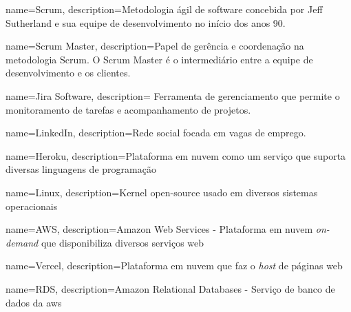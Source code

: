 



 {
	name=Scrum,
	description={Metodologia ágil de software concebida por Jeff Sutherland e sua equipe de desenvolvimento no início dos anos 90.}
}


 {
	name=Scrum Master,
	description={Papel de gerência e coordenação na metodologia Scrum. O Scrum Master é o intermediário entre a equipe de desenvolvimento e os clientes.}
}

 {
	name=Jira Software,
	description={ Ferramenta de gerenciamento que permite o monitoramento de tarefas e acompanhamento de projetos.}
}   

 {
	name=LinkedIn,
	description={Rede social focada em vagas de emprego.}
}   

 {
	name=Heroku,
	description={Plataforma em nuvem como um serviço que suporta diversas linguagens de programação}
} 

 {
	name=Linux,
	description={Kernel open-source usado em diversos sistemas operacionais}
}   

 {
	name=AWS,
	description={Amazon Web Services - Plataforma em nuvem \emph{on-demand} que disponibiliza diversos serviços web}
}    

 {
	name=Vercel,
	description={Plataforma em nuvem que faz o \emph{host} de páginas web}
}  

 {
	name=RDS,
	description={Amazon Relational Databases - Serviço de banco de dados da \gls{aws}}
}

